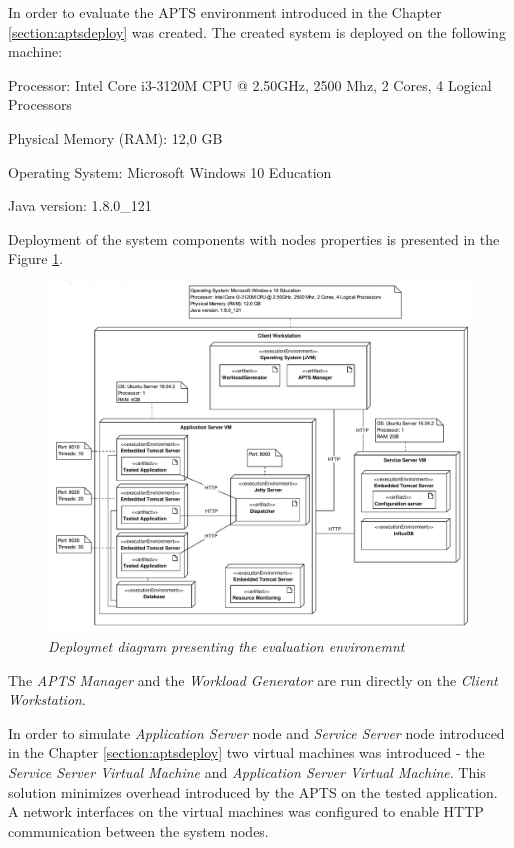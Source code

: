 \documentclass[12pt,a4paper]{article}
\let\tempone\itemize
\let\temptwo\enditemize
\renewenvironment{itemize}{\tempone\addtolength{\itemsep}{-0.4\baselineskip}}{\temptwo}
\begin{document}
In order to evaluate the APTS environment introduced in the Chapter \ref{section:aptsdeploy} was created.
The created system  is deployed on the following machine:
\begin{itemize}
\item Processor: Intel Core i3-3120M CPU @ 2.50GHz, 2500 Mhz, 2 Cores, 4 Logical Processors
\item Physical Memory (RAM): 12,0 GB
\item Operating System: Microsoft Windows 10 Education
\item Java version: 1.8.0\_121
\end{itemize}

Deployment of the system components with nodes properties is presented in the Figure \ref{figure:deployment:evaluation}. 

\begin{figure}[!htb]
\centering
\includegraphics[width=1\textwidth]{ExperimentsEnvironemtDiagram}
\caption{\textit{Deploymet diagram presenting the evaluation environemnt}} \label{figure:deployment:evaluation}
\end{figure}

The \textit{APTS Manager} and the \textit{Workload Generator} are run directly on the \textit{Client Workstation}. 

In order to simulate \textit{Application Server} node and \textit{Service Server} node introduced in the Chapter \ref{section:aptsdeploy} two virtual machines was introduced - the \textit{Service Server Virtual Machine} and \textit{Application Server Virtual Machine}. This solution minimizes overhead introduced by the APTS on the tested application. A network interfaces on the virtual machines was configured to enable HTTP communication between the system nodes. 
\end{document}
